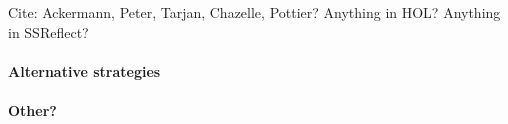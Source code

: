 Cite: Ackermann, Peter, Tarjan, Chazelle, Pottier? Anything in HOL? Anything in SSReflect?

\paragraph*{Alternative strategies}



\paragraph*{Other?}